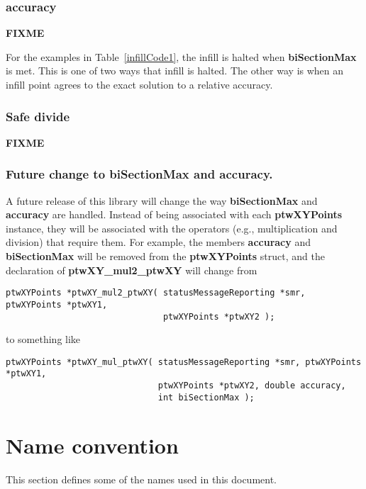 \documentclass[11pt]{article}
\newcommand{\highlight}[1]{{\bf #1}}
\begin{document}
\subsubsection{accuracy}
\highlight{FIXME}

For the examples in Table~\ref{infillCode1}, the infill is halted when \highlight{biSectionMax} is met. This is one of two ways that
infill is halted. The other way is when an infill point agrees to the exact solution to a relative accuracy.

\subsubsection{Safe divide}

\highlight{FIXME}

\subsubsection{Future change to \highlight{biSectionMax} and \highlight{accuracy}.}
A future release of this library will change the way \highlight{biSectionMax} and \highlight{accuracy} are handled. Instead of being
associated with each \highlight{ptwXYPoints} instance, they will be associated with the operators (e.g., multiplication and division)
that require them. For example, the members \highlight{accuracy} and \highlight{biSectionMax} will be removed from the
\highlight{ptwXYPoints} struct, and the declaration of \highlight{ptwXY\_mul2\_ptwXY} will change from

\begin{verbatim}
ptwXYPoints *ptwXY_mul2_ptwXY( statusMessageReporting *smr, ptwXYPoints *ptwXY1, 
                               ptwXYPoints *ptwXY2 );
\end{verbatim}

to something like

\begin{verbatim}
ptwXYPoints *ptwXY_mul_ptwXY( statusMessageReporting *smr, ptwXYPoints *ptwXY1, 
                              ptwXYPoints *ptwXY2, double accuracy, 
                              int biSectionMax );
\end{verbatim}

\section{Name convention}

This section defines some of the names used in this document.
\end{document}
